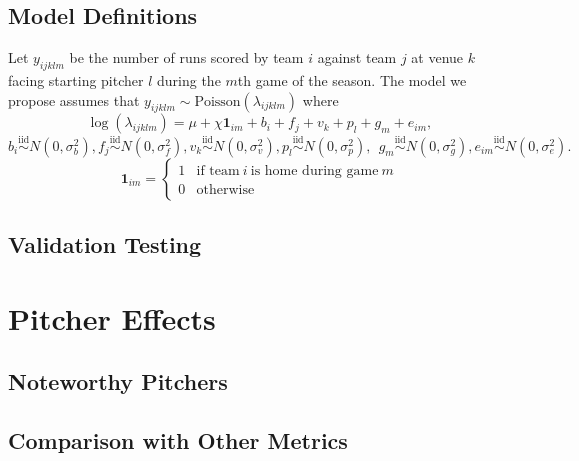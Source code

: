 \documentclass [52pt] {article}
\newcommand{\simiid}{\overset{\text{iid}}{\sim}}
\begin{document}
\subsection{Model Definitions}
Let $y_{ijklm}$ be the number of runs scored by team $i$ against team $j$ at venue $k$ facing starting pitcher $l$ during the $m$th game of the season.  The model we propose assumes that $y_{ijklm}\sim\text{Poisson}(\lambda_{ijklm})$ where
\begin{equation}\label{eq : model1}
\log(\lambda_{ijklm}) = \mu + \chi \mathbf{1}_{im} + b_i + f_j + v_k + p_l + g_m + e_{im},
\end{equation}
\[b_i\simiid N(0,\sigma^2_b), f_j\simiid N(0,\sigma^2_f), v_k\simiid N(0,\sigma^2_v), p_l\simiid N(0, \sigma^2_p),\:\:g_m\simiid N(0, \sigma^2_g), e_{im}\simiid N(0,\sigma^2_e).\]
\[\mathbf{1}_{im} = \begin{cases}
1 & \text{if team}\:i\:\text{is home during game}\:m\\
0 &\text{otherwise}
\end{cases}\]

\subsection{Validation Testing}

\section{Pitcher Effects}

\subsection{Noteworthy Pitchers}

\subsection{Comparison with Other Metrics}
\end{document}
